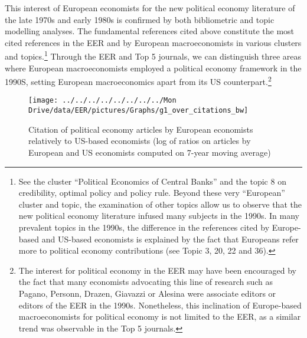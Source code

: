 \documentclass[
  12pt,
  onecolumn]{article}
\begin{document}
This interest of European economists for the new political economy
literature of the late 1970s and early 1980s is confirmed by both
bibliometric and topic modelling analyses. The fundamental references
cited above constitute the most cited references in the EER and by
European macroeconomists in various clusters and topics.\footnote{See
  the cluster ``Political Economics of Central Banks'' and the topic 8
  on credibility, optimal policy and policy rule. Beyond these very
  ``European'' cluster and topic, the examination of other topics allow
  us to observe that the new political economy literature infused many
  subjects in the 1990s. In many prevalent topics in the 1990s, the
  difference in the references cited by Europe-based and US-based
  economists is explained by the fact that Europeans refer more to
  political economy contributions (see Topic 3, 20, 22 and 36).} Through
the EER and Top 5 journals, we can distinguish three areas where
European macroeconomists employed a political economy framework in the
1990S, setting European macroeconomics apart from its US
counterpart.\footnote{The interest for political economy in the EER may
  have been encouraged by the fact that many economists advocating this
  line of research such as Pagano, Personn, Drazen, Giavazzi or Alesina
  were associate editors or editors of the EER in the 1990s.
  Nonetheless, this inclination of Europe-based macroeconomists for
  political economy is not limited to the EER, as a similar trend was
  observable in the Top 5 journals.}

\begin{figure}[H]

{\centering \texttt{[image: ../../../../../../../../Mon Drive/data/EER/pictures/Graphs/g1\_over\_citations\_bw]} 

}

\caption{Citation of political economy articles by European economists relatively to US-based economists (log of ratios on articles by European and US economists computed on 7-year moving average)}\label{fig:plot-political-economy-europe}
\end{figure}
\end{document}
